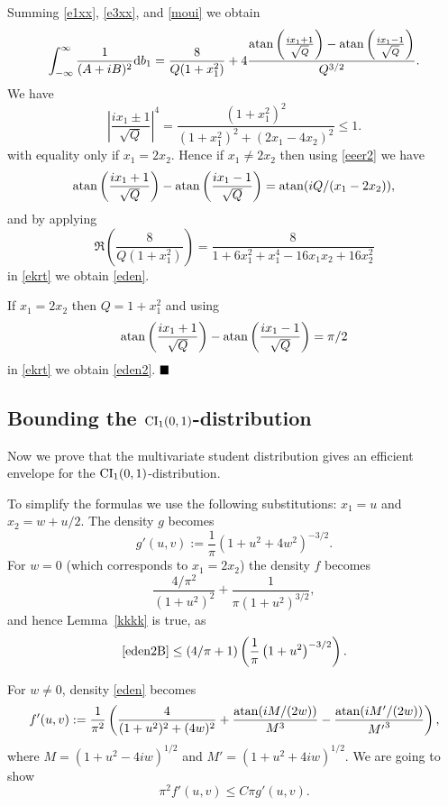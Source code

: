 \documentclass[11pt]{article}
\def\({\left(} \def\){\right)} \def\hatU{\widehat{U}}
\newenvironment{prf}[1]{\noindent{\bf{Proof #1\\}}}{$\hfill\blacksquare$\nopagebreak[4]\vskip 0.3cm}
\newcommand\BPRF[1][:]{\begin{prf}{#1}}
\def\EPRF{\end{prf}}
\begin{document}
Summing \eqref{e1xx}, \eqref{e3xx}, and \eqref{moui} we obtain
\begin{equation}\label{ekrt}
\int_{-\infty}^\infty
\frac{1}{(A+iB)^2}{\rm d}b_{1}=\frac{8}{Q(1+x_1^2)}
+4\frac{{\rm atan}\(\frac{i x_1+1}{\sqrt{Q}}\)-{\rm atan}\(\frac{i x_1-1}{\sqrt{Q}}\)}
{Q^{3/2}}.
\end{equation}
We have
$$
\left|\frac{ix_1\pm 1}{\sqrt{Q}}\right|^4=\frac{(1+x_1^2)^2}{(1 + x_1^2)^2 + (2x_1-4x_2)^2}\leq 1.
$$
with equality only if $x_1=2x_2$. Hence if $x_1\neq 2x_2$ then using \eqref{eeer2} we have
\begin{equation*}
{\rm atan}\(\frac{i x_1+1}{\sqrt{Q}}\)-{\rm atan}\(\frac{i x_1-1}{\sqrt{Q}}\)={\rm atan}(iQ/(x_1-2x_2)),
\end{equation*}
and by applying
\begin{equation*}\label{uhy}
\Re\(\frac{8}{Q(1+x_1^2)}\)=\frac{8}{1 + 6 x_1^2 + x_1^4 - 16 x_1 x_2 + 16 x_2^2}
\end{equation*}
in \eqref{ekrt} we obtain \eqref{eden}.

If $x_1=2x_2$ then $Q=1+x_1^2$ and using
\begin{equation*}\label{pppq}
{\rm atan}\(\frac{i x_1+1}{\sqrt{Q}}\)-{\rm atan}\(\frac{i x_1-1}{\sqrt{Q}}\)=\pi/2
\end{equation*}
in \eqref{ekrt} we obtain \eqref{eden2}.
\EPRF

\subsection{Bounding the ${\rm CI}_1(0,1)$-distribution}\label{sbound}

Now we prove that the multivariate student distribution gives
an efficient envelope for the ${\rm CI}_1(0,1)$-distribution.

\vskip 0.2cm
\BPRF[of Lemma~\ref{kkkk}:]
To simplify the formulas we use the following substitutions: $x_1=u$ and $x_2=w+u/2$.
The density $g$ becomes
\begin{equation*}\label{ZZZ2}
g'(u,v):=\frac{1}{\pi}\(1+u^2+4w^2\)^{-3/2}.
\end{equation*}
For $w=0$ (which corresponds to $x_1=2x_2$) the density $f$ becomes
\begin{equation}\label{eden2B}
\frac{4/\pi^2}{(1 + u^2)^2}
+\frac{1}{\pi (1+u^2)^{3/2}},
\end{equation}
and hence Lemma~\ref{kkkk} is  true, as
$$
\eqref{eden2B}\leq (4/\pi+1)\(\frac{1}{\pi}\(1+u^2\)^{-3/2}\).
$$

For $w\neq 0$, density \eqref{eden} becomes
\begin{equation*}\label{zzzq}
f'(u,v):=\frac{1}{\pi^2}\(
\frac{4}{(1+u^2)^2+(4w)^2}+\frac{{\rm atan}(iM/(2w))}{M^{3}}-\frac{{\rm atan}(iM'/(2w))}{{M'}^{3}}\),
\end{equation*}
where $M=(1+u^2-4iw)^{1/2}$ and $M'=(1+u^2+4iw)^{1/2}$. We are going to show
\begin{equation}\label{leq2}
\pi^2 f'(u,v)
\leq C\pi g'(u,v).
\end{equation}
\end{document}
